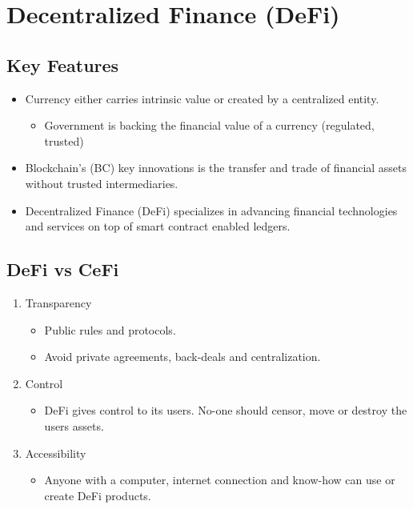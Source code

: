 \section{Decentralized Finance (DeFi)}
\subsection{Key Features}
\begin{itemize}
  \item Currency either carries intrinsic value or created by a centralized entity.
  \begin{itemize}
    \item Government is backing the financial value of a currency (regulated, trusted)
  \end{itemize} 
  \item Blockchain's (BC) key innovations is the transfer and trade of financial assets without trusted intermediaries.
  \item Decentralized Finance (DeFi) specializes in advancing financial technologies and services on top of smart contract enabled ledgers.
\end{itemize}

\subsection{DeFi vs CeFi}
\begin{enumerate}
  \item Transparency
  \begin{itemize}
    \item Public rules and protocols.
    \item Avoid private agreements, back-deals and centralization.
  \end{itemize}
  \item Control
  \begin{itemize}
    \item DeFi gives control to its users. No-one should censor, move or destroy the users assets.
  \end{itemize}
  \item Accessibility
  \begin{itemize}
    \item Anyone with a computer, internet connection and know-how can use or create DeFi products.
  \end{itemize}
\end{enumerate}


